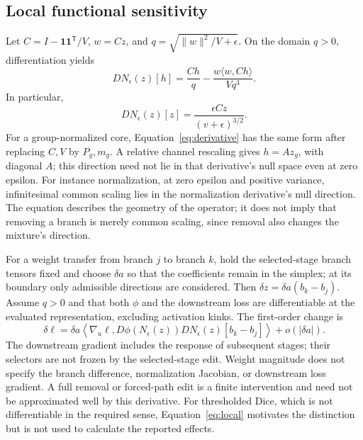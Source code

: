 \documentclass[mathematics,article,submit,pdftex,moreauthors]{Definitions/mdpi}
\begin{document}
\subsection{Local functional sensitivity}
Let $C=I-\mathbf{1}\mathbf{1}^{\mathsf T}/V$, $w=Cz$, and
$q=\sqrt{\|w\|^2/V+\epsilon}$. On the domain $q>0$, differentiation yields
\begin{equation}\label{eq:derivative}
 DN_\epsilon(z)[h]=\frac{Ch}{q}
 -\frac{w\langle w,Ch\rangle}{Vq^3}.
\end{equation}
In particular,
\begin{equation}
 DN_\epsilon(z)[z]=\frac{\epsilon Cz}{(v+\epsilon)^{3/2}}.
\end{equation}
For a group-normalized core, Equation~\eqref{eq:derivative} has the same
form after replacing $C,V$ by $P_g,m_g$. A relative channel rescaling gives
$h=Az_g$, with diagonal $A$; this direction need not lie in that derivative's
null space even at zero epsilon. For instance normalization,
at zero epsilon and positive variance, infinitesimal common scaling lies in
the normalization derivative's null direction. The equation describes the
geometry of the operator; it does not imply that removing a branch is merely
common scaling, since removal also changes the mixture's direction.

For a weight transfer from branch $j$ to branch $k$, hold the selected-stage
branch tensors fixed and choose $\delta a$ so that the coefficients remain
in the simplex; at its boundary only admissible directions are considered.
Then $\delta z=\delta a(b_k-b_j)$. Assume $q>0$ and that both $\phi$ and the
downstream loss are differentiable at the evaluated representation, excluding
activation kinks. The first-order change is
\begin{equation}\label{eq:local}
 \delta\ell=\delta a\left\langle\nabla_u\ell,
 D\phi(N_\epsilon(z))DN_\epsilon(z)[b_k-b_j]\right\rangle
 +o(|\delta a|).
\end{equation}
The downstream gradient includes the response of subsequent stages; their
selectors are not frozen by the selected-stage edit.
Weight magnitude does not specify the branch difference, normalization
Jacobian, or downstream loss gradient. A full removal or forced-path edit is
a finite intervention and need not be approximated well by this derivative.
For thresholded Dice, which is not differentiable in the required sense,
Equation~\eqref{eq:local} motivates the distinction but is not used to
calculate the reported effects.
\end{document}
